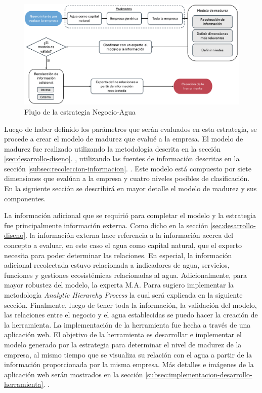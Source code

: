 \begin{figure}[H]
    \centering
    \includegraphics[scale=0.25]{images/5-implementacion/estrategia-negocio-agua.png}
    \caption{Flujo de la estrategia Negocio-Agua}
    \label{fig:estrategia-negocio-agua}
\end{figure}

Luego de haber definido los parámetros que serán evaluados en esta estrategia, se procede a crear el modelo de madurez que evalué a la empresa. El modelo de madurez fue realizado utilizando la metodología descrita en la sección \ref{sec:desarrollo-diseno}.  , utilizando las fuentes de información descritas en la sección \ref{subsec:recoleccion-informacion}. . Este modelo está compuesto por siete dimensiones que evalúan a la empresa y cuatro niveles posibles de clasificación.  En la siguiente sección se describirá en mayor detalle el modelo de madurez y sus componentes.

La información adicional que se requirió para completar el modelo y la estrategia fue principalmente información externa. Como dicho en la sección \ref{sec:desarrollo-diseno}.   la información externa hace referencia a la información acerca del concepto a evaluar, en este caso el agua como capital natural, que el experto necesita para poder determinar las relaciones. En especial, la información adicional recolectada estuvo relacionada a indicadores de agua, servicios, funciones y gestiones ecosistémicas relacionadas al agua. Adicionalmente, para mayor robustez del modelo, la experta M.A. Parra sugiero implementar la metodología \textit{Analytic Hierarchy Process} la cual será explicada en la siguiente sección. Finalmente, luego de tener toda la información, la validación del modelo, las relaciones entre el negocio y el agua establecidas se puedo hacer la creación de la herramienta. La implementación de la herramienta fue hecha a través de una aplicación web. El objetivo de la herramienta es desarrollar e implementar el modelo generado por la estrategia para determinar el nivel de madurez de la empresa, al mismo tiempo que se visualiza su relación con el agua a partir de la información proporcionada por la misma empresa. Más detalles e imágenes de la aplicación web serán mostrados en la sección \ref{subsec:implementacion-desarrollo-herramienta}. .

